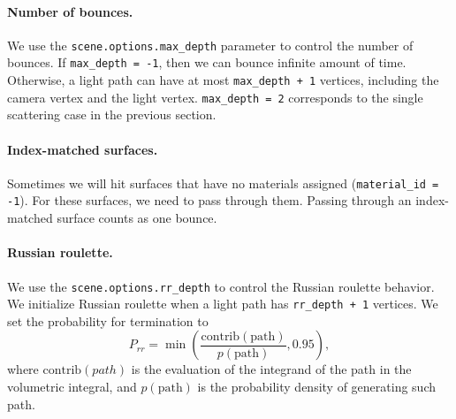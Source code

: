 \paragraph{Number of bounces.} We use the \lstinline{scene.options.max_depth} parameter to control the number of bounces. If \lstinline{max_depth = -1}, then we can bounce infinite amount of time. Otherwise, a light path can have at most \lstinline{max_depth + 1} vertices, including the camera vertex and the light vertex. \lstinline{max_depth = 2} corresponds to the single scattering case in the previous section.

\paragraph{Index-matched surfaces.} Sometimes we will hit surfaces that have no materials assigned (\lstinline{material_id = -1}). For these surfaces, we need to pass through them. Passing through an index-matched surface counts as one bounce.

\paragraph{Russian roulette.} We use the \lstinline{scene.options.rr_depth} to control the Russian roulette behavior. We initialize Russian roulette when a light path has \lstinline{rr_depth + 1} vertices. We set the probability for termination to
\begin{equation}
P_{rr} = \min\left(\frac{\text{contrib}(\text{path})}{p(\text{path})}, 0.95\right),
\end{equation}
where $\text{contrib}(path)$ is the evaluation of the integrand of the path in the volumetric integral, and $p(\text{path})$ is the probability density of generating such path.

